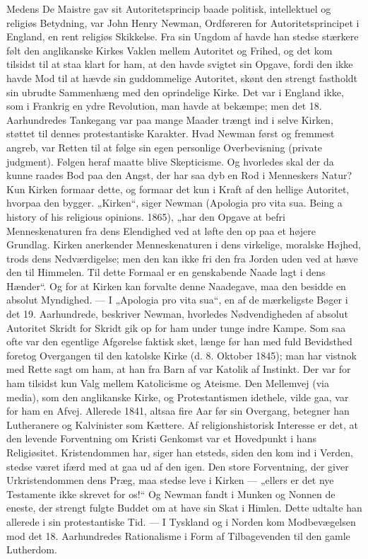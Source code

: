\documentclass[12pt,a4paper,openany]{book}
\newcommand{\opage}[1]{\marginnote{\footnotesize\textit{[#1]}}}
\begin{document}
Medens De Maistre gav sit Autoritetsprincip baade politisk, intellektuel
og religiøs Betydning, var John Henry Newman, Ordføreren
for Autoritetsprincipet i England, en rent religiøs Skikkelse. Fra sin
Ungdom af havde han stedse stærkere følt den anglikanske Kirkes
Vaklen mellem Autoritet og Frihed, og det kom tilsidst til at staa
klart for ham, at den havde svigtet sin Opgave, fordi den ikke havde
Mod til at hævde sin guddommelige Autoritet, skønt den strengt
fastholdt sin ubrudte Sammenhæng med den oprindelige Kirke. Det
var i England ikke, som i Frankrig en ydre Revolution, man havde
at bekæmpe; men det 18. Aarhundredes Tankegang var paa mange
Maader trængt ind i selve Kirken, støttet til dennes protestantiske
Karakter. Hvad Newman først og fremmest angreb, var Retten til
at følge sin egen personlige Overbevisning (private judgment). Følgen
heraf maatte blive Skepticisme. Og hvorledes skal der da kunne
\opage{116}raades Bod paa den Angst, der har saa dyb en Rod i Menneskers
Natur? Kun Kirken formaar dette, og formaar det kun i Kraft af
den hellige Autoritet, hvorpaa den bygger. „Kirken“, siger Newman
(Apologia pro vita sua. Being a history of his religious opinions.
1865), „har den Opgave at befri Menneskenaturen fra dens Elendighed
ved at løfte den op paa et højere Grundlag. Kirken anerkender
Menneskenaturen i dens virkelige, moralske Højhed, trods dens Nedværdigelse;
men den kan ikke fri den fra Jorden uden ved at hæve
den til Himmelen. Til dette Formaal er en genskabende Naade lagt
i dens Hænder“. Og for at Kirken kan forvalte denne Naadegave, maa
den besidde en absolut Myndighed. --- I „Apologia pro vita sua“, en
af de mærkeligste Bøger i det 19. Aarhundrede, beskriver Newman,
hvorledes Nødvendigheden af absolut Autoritet Skridt for Skridt gik
op for ham under tunge indre Kampe. Som saa ofte var den egentlige
Afgørelse faktisk sket, længe før han med fuld Bevidsthed foretog
Overgangen til den katolske Kirke (d. 8. Oktober 1845); man har
vistnok med Rette sagt om ham, at han fra Barn af var Katolik af
Instinkt. Der var for ham tilsidst kun Valg mellem Katolicisme og
Ateisme. Den Mellemvej (via media), som den anglikanske Kirke, og
Protestantismen idethele, vilde gaa, var for ham en Afvej. Allerede
1841, altsaa fire Aar før sin Overgang, betegner han Lutheranere og
Kalvinister som Kættere. Af religionshistorisk Interesse er det, at den
levende Forventning om Kristi Genkomst var et Hovedpunkt i hans
Religiøsitet. Kristendommen har, siger han etsteds, siden den kom
ind i Verden, stedse været ifærd med at gaa ud af den igen. Den
store Forventning, der giver Urkristendommen dens Præg, maa stedse
leve i Kirken --- „ellers er det nye Testamente ikke skrevet for os!“
Og Newman fandt i Munken og Nonnen de eneste, der strengt fulgte
Buddet om at have sin Skat i Himlen. Dette udtalte han allerede i
sin protestantiske Tid. ---
I Tyskland og i Norden kom Modbevægelsen mod det 18. Aarhundredes
Rationalisme i Form af Tilbagevenden til den gamle Lutherdom.
\end{document}

